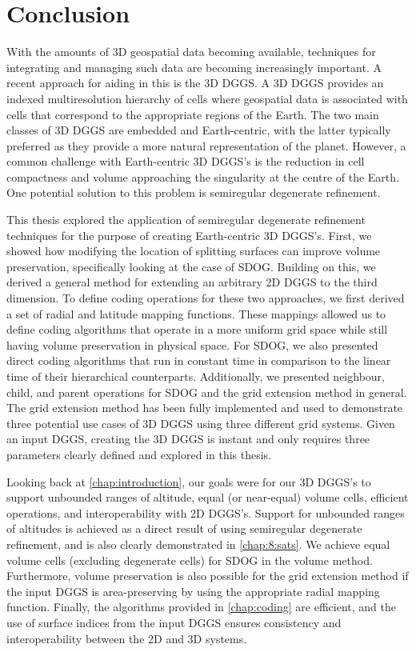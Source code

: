 \chapter{Conclusion} \label{chap:conclusion}
With the amounts of 3D geospatial data becoming available, techniques for integrating and managing such data are becoming increasingly important.
A recent approach for aiding in this is the 3D DGGS.
A 3D DGGS provides an indexed multiresolution hierarchy of cells where geospatial data is associated with cells that correspond to the appropriate regions of the Earth.
The two main classes of 3D DGGS are embedded and Earth-centric, with the latter typically preferred as they provide a more natural representation of the planet.
However, a common challenge with Earth-centric 3D DGGS's is the reduction in cell compactness and volume approaching the singularity at the centre of the Earth.
One potential solution to this problem is semiregular degenerate refinement.


This thesis explored the application of semiregular degenerate refinement techniques for the purpose of creating Earth-centric 3D DGGS's.
First, we showed how modifying the location of splitting surfaces can improve volume preservation, specifically looking at the case of SDOG.
Building on this, we derived a general method for extending an arbitrary 2D DGGS to the third dimension.
To define coding operations for these two approaches, we first derived a set of radial and latitude mapping functions.
These mappings allowed us to define coding algorithms that operate in a more uniform grid space while still having volume preservation in physical space.
For SDOG, we also presented direct coding algorithms that run in constant time in comparison to the linear time of their hierarchical counterparts.
Additionally, we presented neighbour, child, and parent operations for SDOG and the grid extension method in general.
The grid extension method has been fully implemented and used to demonstrate three potential use cases of 3D DGGS using three different grid systems.
Given an input DGGS, creating the 3D DGGS is instant and only requires three parameters clearly defined and explored in this thesis.


Looking back at \cref{chap:introduction}, our goals were for our 3D DGGS's to support unbounded ranges of altitude, equal (or near-equal) volume cells, efficient operations, and interoperability with 2D DGGS's.
Support for unbounded ranges of altitudes is achieved as a direct result of using semiregular degenerate refinement, and is also clearly demonstrated in \cref{chap:8:sats}.
We achieve equal volume cells (excluding degenerate cells) for SDOG in the volume method.
Furthermore, volume preservation is also possible for the grid extension method if the input DGGS is area-preserving by using the appropriate radial mapping function.
Finally, the algorithms provided in \cref{chap:coding} are efficient, and the use of surface indices from the input DGGS ensures consistency and interoperability between the 2D and 3D systems.


